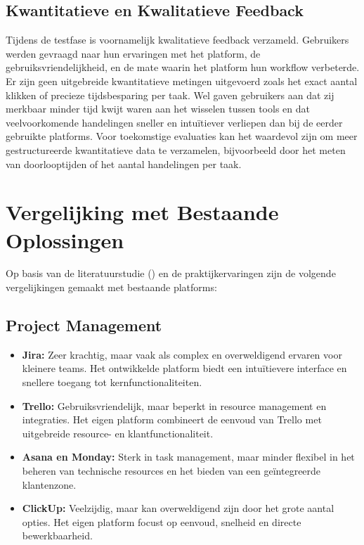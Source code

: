 \subsection{Kwantitatieve en Kwalitatieve Feedback}
Tijdens de testfase is voornamelijk kwalitatieve feedback verzameld. Gebruikers werden gevraagd naar hun ervaringen met het platform, de gebruiksvriendelijkheid, en de mate waarin het platform hun workflow verbeterde. Er zijn geen uitgebreide kwantitatieve metingen uitgevoerd zoals het exact aantal klikken of precieze tijdsbesparing per taak. Wel gaven gebruikers aan dat zij merkbaar minder tijd kwijt waren aan het wisselen tussen tools en dat veelvoorkomende handelingen sneller en intuïtiever verliepen dan bij de eerder gebruikte platforms. Voor toekomstige evaluaties kan het waardevol zijn om meer gestructureerde kwantitatieve data te verzamelen, bijvoorbeeld door het meten van doorlooptijden of het aantal handelingen per taak.

\section{Vergelijking met Bestaande Oplossingen}
\label{sec:vergelijking-bestaand}

Op basis van de literatuurstudie (\textcite{stand-van-zaken}) en de praktijkervaringen zijn de volgende vergelijkingen gemaakt met bestaande platforms:

\subsection{Project Management}
\begin{itemize}
    \item \textbf{Jira:} Zeer krachtig, maar vaak als complex en overweldigend ervaren voor kleinere teams. Het ontwikkelde platform biedt een intuïtievere interface en snellere toegang tot kernfunctionaliteiten.
    \item \textbf{Trello:} Gebruiksvriendelijk, maar beperkt in resource management en integraties. Het eigen platform combineert de eenvoud van Trello met uitgebreide resource- en klantfunctionaliteit.
    \item \textbf{Asana en Monday:} Sterk in task management, maar minder flexibel in het beheren van technische resources en het bieden van een geïntegreerde klantenzone.
    \item \textbf{ClickUp:} Veelzijdig, maar kan overweldigend zijn door het grote aantal opties. Het eigen platform focust op eenvoud, snelheid en directe bewerkbaarheid.
\end{itemize}

